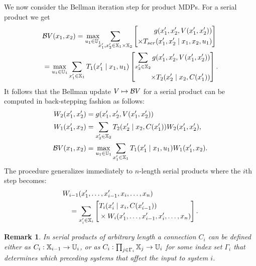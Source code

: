 \documentclass[conference]{IEEEtran}
\newtheorem{remark}{Remark}
\begin{document}
We now consider the Bellman iteration step for product MDPs. For a serial product we get
\begin{equation*}
\begin{aligned}
  & \bellman V (x_1, x_2) = \max_{u_1 \in \U_1} \hspace{-2mm} \sum_{x_1', x_2' \in \X_1 \times \X_2}  \left[ \begin{aligned}
  	g(x_1', x_2', V(x_1', x_2')) \\
  	\times T_{ser}(x_1', x_2' \mid x_1, x_2, u_1)
  \end{aligned} \right] \\
  & = \max_{u_1 \in \U_1} \sum_{x_1' \in \X_1}  T_1(x_1' \mid x_1, u_1 ) \left[ \begin{aligned}
   	\sum_{x_2' \in \X_2}  g(x_1', x_2', V(x_1', x_2')) \\
   	\times  T_2(x_2' \mid x_2, C(x_1'))
   \end{aligned} \right].
\end{aligned}
\end{equation*}
It follows that the Bellman update $V \mapsto \mathcal{B} V$ for a serial product can be computed in back-stepping fashion as follows:
\begin{equation*}
\begin{aligned}
  W_2(x_1', x_2') & = g(x_1', x_2', V(x_1', x_2')) \\
  W_1(x_1', x_2) & = \sum_{x_2' \in \mathbb{X}_2}  T_2(x_2' \mid x_2, C(x_1')) W_2(x_1', x_2'), \\
  \mathcal{B} V(x_1, x_2) & = \max_{u_1 \in \mathbb{U}_1} \sum_{x_1' \in \mathbb{X}_1} T_1(x_1' \mid x_1, u_1) W_1(x_1', x_2).
\end{aligned}
\end{equation*}
The procedure generalizes immediately to $n$-length serial products where the $i$th step becomes:
\begin{equation}
\label{eq:general_decomp}
\begin{aligned}
  & W_{i-1}(x_1', \ldots, x_{i-1}', x_i, \ldots, x_n) \\
  & \quad = \sum_{x_{i}' \in \X_{i}} \left[ \begin{aligned} & T_{i} (x_{i}' \mid x_{i}, C(x_{i-1}')) \\ 
   & \times W_{i} (x_1', \ldots, x_{i-1}', x_i', \ldots, x_n)
    \end{aligned} \right].
\end{aligned}
\end{equation}

\begin{remark}
  In serial products of arbitrary length a connection $C_i$ can be defined either as $C_i: \mathbb{X}_{i-1} \rightarrow \mathbb{U}_i$, or as $C_i: \prod_{j \in \Gamma_i} \mathbb{X}_j \rightarrow \mathbb{U}_i$ for some index set $\Gamma_i$ that determines which preceding systems that affect the input to system $i$.
\end{remark}
\end{document}
